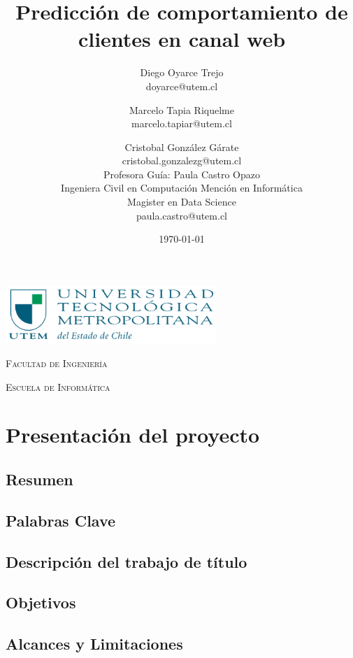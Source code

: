 \documentclass{report}
\title{\Huge Predicción de comportamiento de clientes en canal web}
\author{Diego Oyarce Trejo \\ doyarce@utem.cl \and
        Marcelo Tapia Riquelme \\ marcelo.tapiar@utem.cl \and
        Cristobal González Gárate \\ cristobal.gonzalezg@utem.cl \\
        \vspace{2.0cm}
        Profesora Guía: Paula Castro Opazo \\Ingeniera Civil en Computación Mención en Informática \\Magister en Data Science \\paula.castro@utem.cl
        }
\date{\today}
\begin{document}
\begin{titlepage}
  \centering  
  \includegraphics[width=0.6\textwidth]{img/logoutem.png}  
  \vspace{1cm}
  
  \textsc{\normalsize Facultad de Ingeniería}  
  \vspace{0.5cm}
  
  \textsc{\normalsize Escuela de Informática}
  {\let\newpage\relax\maketitle}
\end{titlepage}

\tableofcontents

\listoffigures

\setcounter{section}{1}

\chapter{Presentación del proyecto}

\section{Resumen}


\section{Palabras Clave}


\section{Descripción del trabajo de título}


\section{Objetivos}


\section{Alcances y Limitaciones}

\end{document}
